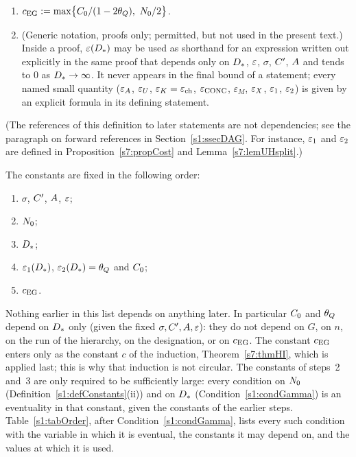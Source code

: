 \begin{definition}
\begin{enumerate}
$\Czero\le\Dstar/2+\cTotR$.
\item[(vi)] $\cEG\defeq\max\bigl\{\Czero/(1-2\thetaQ),\ \Nzero/2\bigr\}$.
\item[(vii)] (Generic notation, proofs only; permitted, but not used in the
present text.) Inside a proof, $\varepsilon(D_{*})$ may be
used as shorthand for an expression written out explicitly in the same proof
that depends only on $D_{*}$, $\varepsilon$, $\sigma$, $C'$, $A$ and tends to $0$ as
$D_{*}\to\infty$. It never appears in the final bound of a statement; every
named small quantity ($\varepsilon_{A}$, $\varepsilon_{U}$, $\varepsilon_{K}=\varepsilon_{\mathrm{ch}}$, $\varepsilon_{\mathrm{CONC}}$,
$\varepsilon_M$, $\varepsilon_{X}$, $\varepsilon_{1}$, $\varepsilon_{2}$) is given by an explicit formula
in its defining statement.
\end{enumerate}
{\small\noindent(The references of this definition to later statements are not
dependencies; see the paragraph on forward references in
Section~\ref{s1:ssecDAG}. For instance, $\varepsilon_{1}$ and $\varepsilon_{2}$ are defined in
Proposition~\ref{s7:propCost} and Lemma~\ref{s7:lemUHsplit}.)\par}
\end{definition}

\begin{remark}\label{s1:remOrder}
The constants are fixed in the following order:
\begin{enumerate}
\item $\sigma$, $C'$, $A$, $\varepsilon$;
\item $N_{0}$;
\item $D_{*}$;
\item $\varepsilon_{1}(D_{*})$, $\varepsilon_{2}(D_{*})=\theta_{Q}$ and $C_{0}$;
\item $c_{\mathrm{EG}}$.
\end{enumerate}
Nothing earlier in this list depends on anything later. In particular $C_{0}$
and $\theta_{Q}$ depend on $D_{*}$ only (given the fixed $\sigma,C',A,\varepsilon$):
they do not depend on $G$, on $n$, on the run of the hierarchy, on the
designation, or on $c_{\mathrm{EG}}$. The constant $c_{\mathrm{EG}}$ enters only as the constant $c$
of the induction, Theorem~\ref{s7:thmHI}, which is applied last; this is why
that induction is not circular. The constants of steps~2 and~3 are only required to be sufficiently
large: every condition on $N_{0}$ (Definition~\ref{s1:defConstants}(ii)) and on
$D_{*}$ (Condition~\ref{s1:condGamma}) is an eventuality in that constant, given
the constants of the earlier steps. Table~\ref{s1:tabOrder}, after
Condition~\ref{s1:condGamma}, lists every such condition with the variable in
which it is eventual, the constants it may depend on, and the values at which it
is used.
\end{remark}

